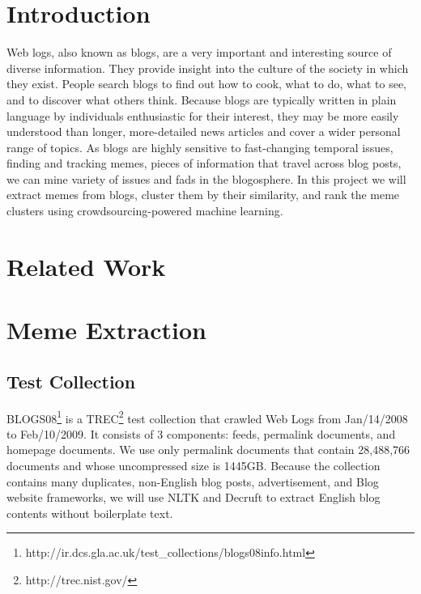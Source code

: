 \documentclass{sig-alternate}
\begin{document}



\section{Introduction}

Web logs, also known as blogs, are a very important and interesting source of diverse information. They provide insight into the culture of the society in which they exist. People search blogs to find out how to cook, what to do, what to see, and to discover what others think. Because blogs are typically written in plain language by individuals enthusiastic for their interest, they may be more easily understood than longer, more-detailed news articles and cover a wider personal range of topics. 
As blogs are highly sensitive to fast-changing temporal issues, finding and tracking memes, pieces of information that travel across blog posts, we can mine variety of issues and fads in the blogosphere. In this project we will extract memes from blogs, cluster them by their similarity, and rank the meme clusters using crowdsourcing-powered machine learning.

\section{Related Work}

\section{Meme Extraction}

\subsection{Test Collection}

BLOGS08\footnote{http://ir.dcs.gla.ac.uk/test\_collections/blogs08info.html} is a TREC\footnote{http://trec.nist.gov/} test collection that crawled Web Logs from Jan/14/2008 to Feb/10/2009. It consists of 3 components: feeds, permalink documents, and homepage documents. We use only permalink documents that contain 28,488,766 documents and whose uncompressed size is 1445GB. Because the collection contains many duplicates, non-English blog posts, advertisement, and Blog website frameworks, we will use NLTK and Decruft to extract English blog contents without boilerplate text.
\end{document}
